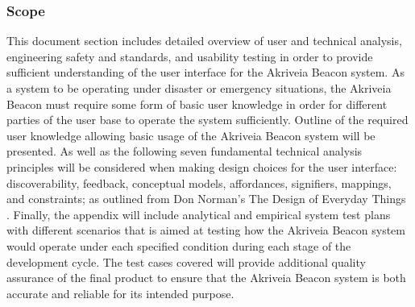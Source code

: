 \subsubsection{Scope}
\medskip
This document section includes detailed overview of user and technical analysis, engineering safety and standards, and usability testing in order to provide sufficient understanding of the user interface for the Akriveia Beacon system. As a system to be operating under disaster or emergency situations, the Akriveia Beacon must require some form of basic user knowledge in order for different parties of the user base to operate the system sufficiently. Outline of the required user knowledge allowing basic usage of the Akriveia Beacon system will be presented. As well as the following seven fundamental technical analysis principles will be considered when making design choices for the user interface: discoverability, feedback, conceptual models, affordances, signifiers, mappings, and constraints; as outlined from Don Norman's The Design of Everyday Things \cite{R10-3-1}. Finally, the appendix will include analytical and empirical system test plans with different scenarios that is aimed at testing how the Akriveia Beacon system would operate under each specified condition during each stage of the development cycle. The test cases covered will provide additional quality assurance of the final product to ensure that the Akriveia Beacon system is both accurate and reliable for its intended purpose.







